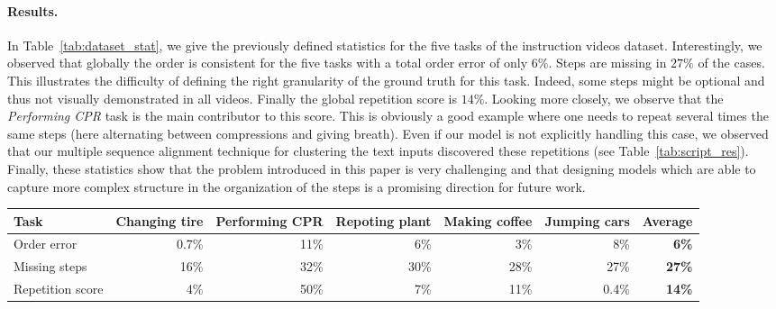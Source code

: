 \documentclass[10pt,twocolumn,letterpaper]{article}
\begin{document}
\paragraph{Results.}
In Table~\ref{tab:dataset_stat}, we give the previously defined statistics for the five tasks of the instruction videos dataset.
Interestingly, we observed that globally the order is consistent for the five tasks with a total order error of only $6\%$.
Steps are missing in $27\%$ of the cases. 
This illustrates the difficulty of defining the right granularity of the ground truth for this task. 
Indeed, some steps might be optional and thus not visually demonstrated in all videos.
Finally the global repetition score is $14\%$.
Looking more closely, we observe that the \emph{Performing CPR} task is the main contributor to this score.
This is obviously a good example where one needs to repeat several times the same steps (here alternating between compressions and giving breath).
Even if our model is not explicitly handling this case, we observed that our multiple sequence alignment technique for clustering the text inputs discovered these repetitions (see Table~\ref{tab:script_res}).
Finally, these statistics show that the problem introduced in this paper is very challenging and that designing models which are able to capture more complex structure in the organization of the steps is a promising direction for future work.

\begin{table*}[ht]
\centering
\begin{tabular}{@{}lrrrrrr@{}}
\toprule
Task             & \multicolumn{1}{l}{Changing tire} & \multicolumn{1}{l}{Performing CPR} & \multicolumn{1}{l}{Repoting plant} & Making coffee & \multicolumn{1}{c}{Jumping cars} & \multicolumn{1}{c}{\textbf{Average}} \\ \midrule
Order error      & 0.7\%                             & 11\%                               & 6\%                                & 3\%           & 8\%                              & \textbf{6\%}                       \\
Missing steps    & 16\%                              & 32\%                               & 30\%                               & 28\%          & 27\%                             & \textbf{27\%}                      \\
Repetition score & 4\%                               & 50\%                               & 7\%                                & 11\%          & 0.4\%                            & \textbf{14\%}                      \\ \bottomrule
\end{tabular}
\caption{Statistics of the instruction video dataset.}
\label{tab:dataset_stat}
\end{table*}
\end{document}
